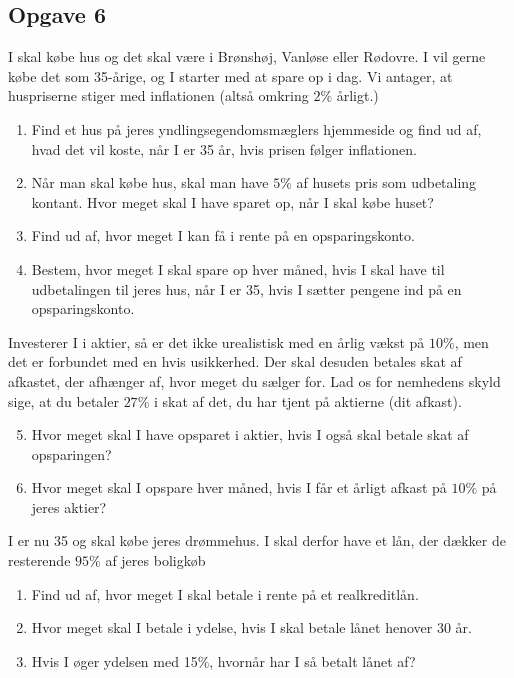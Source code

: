 \subsection*{Opgave 6}
I skal købe hus og det skal være i Brønshøj, Vanløse eller Rødovre. I vil gerne købe det som 35-årige, og I starter med at spare op i dag. Vi antager, at huspriserne stiger med inflationen (altså omkring $2\%$ årligt.)
\begin{enumerate}[label=\roman*)]
	\item Find et hus på jeres yndlingsegendomsmæglers hjemmeside og find ud af, hvad det vil koste,
	 når I er 35 år, hvis prisen følger inflationen. 
	\item Når man skal købe hus, skal man have $5\%$ af husets pris som udbetaling kontant. Hvor meget skal 
	I have sparet op, når I skal købe huset?
	\item Find ud af, hvor meget I kan få i rente på en opsparingskonto.
	\item Bestem, hvor meget I skal spare op hver måned, hvis I skal have til udbetalingen til jeres hus, når I 
	er 35, hvis I sætter pengene ind på en opsparingskonto. 
\end{enumerate}
Investerer I i aktier, så er det ikke urealistisk med en årlig vækst på $10\%$, men det er forbundet med en hvis usikkerhed. Der skal desuden betales skat af afkastet, der afhænger af, hvor meget du sælger for. Lad os for nemhedens skyld sige, at du betaler $27\%$ i skat af det, du har tjent på aktierne (dit afkast). 
\begin{enumerate}[label=\roman*)]
	\setcounter{enumi}{4}
	\item Hvor meget skal I have opsparet i aktier, hvis I også skal betale skat af opsparingen?
	\item Hvor meget skal I opspare hver måned, hvis I får et årligt afkast på $10\%$ på jeres aktier?
\end{enumerate}
I er nu 35 og skal købe jeres drømmehus. I skal derfor have et lån, der dækker de resterende $95\%$ af jeres boligkøb
\begin{enumerate}[label=\roman*)]
	\item Find ud af, hvor meget I skal betale i rente på et realkreditlån.
	\item Hvor meget skal I betale i ydelse, hvis I skal betale lånet henover 30 år. 
	\item Hvis I øger ydelsen med 15$\%$, hvornår har I så betalt lånet af?
\end{enumerate}